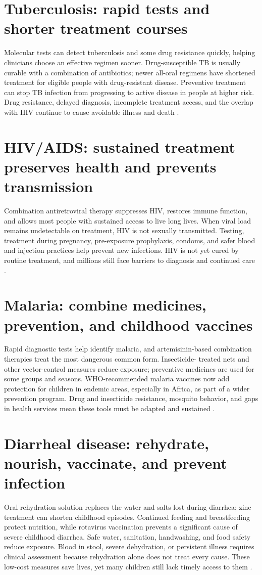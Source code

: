 \documentclass[12pt,oneside]{book}
\begin{document}
\section{Tuberculosis: rapid tests and shorter treatment courses}
Molecular tests can detect tuberculosis and some drug resistance quickly,
helping clinicians choose an effective regimen sooner. Drug-susceptible TB
is usually curable with a combination of antibiotics; newer all-oral regimens
have shortened treatment for eligible people with drug-resistant disease.
Preventive treatment can stop TB infection from progressing to active disease
in people at higher risk. Drug resistance, delayed diagnosis, incomplete
treatment access, and the overlap with HIV continue to cause avoidable illness
and death \cite{whoTB2026}.

\section{HIV/AIDS: sustained treatment preserves health and prevents transmission}
Combination antiretroviral therapy suppresses HIV, restores immune function,
and allows most people with sustained access to live long lives. When viral
load remains undetectable on treatment, HIV is not sexually transmitted.
Testing, treatment during pregnancy, pre-exposure prophylaxis, condoms, and
safer blood and injection practices help prevent new infections. HIV is not
yet cured by routine treatment, and millions still face barriers to diagnosis
and continued care \cite{whoHIV2026}.

\section{Malaria: combine medicines, prevention, and childhood vaccines}
Rapid diagnostic tests help identify malaria, and artemisinin-based
combination therapies treat the most dangerous common form. Insecticide-
treated nets and other vector-control measures reduce exposure; preventive
medicines are used for some groups and seasons. WHO-recommended malaria
vaccines now add protection for children in endemic areas, especially in
Africa, as part of a wider prevention program. Drug and insecticide
resistance, mosquito behavior, and gaps in health services mean these tools
must be adapted and sustained \cite{whoMalaria2025,whoMalariaVaccineUpdate}.

\section{Diarrheal disease: rehydrate, nourish, vaccinate, and prevent infection}
Oral rehydration solution replaces the water and salts lost during diarrhea;
zinc treatment can shorten childhood episodes. Continued feeding and
breastfeeding protect nutrition, while rotavirus vaccination prevents a
significant cause of severe childhood diarrhea. Safe water, sanitation,
handwashing, and food safety reduce exposure. Blood in stool, severe
dehydration, or persistent illness requires clinical assessment because
rehydration alone does not treat every cause. These low-cost measures save
lives, yet many children still lack timely access to them
\cite{whoDiarrhoea2024}.
\end{document}

